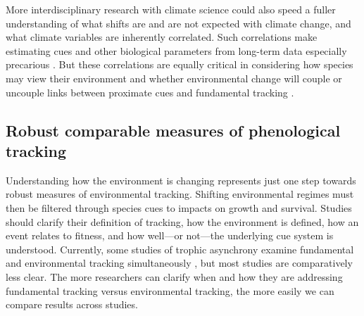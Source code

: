 \documentclass[11pt,letterpaper]{article}
\begin{document}
More interdisciplinary research with climate science could also speed a fuller understanding of what shifts are and are not expected with climate change, and what climate variables are inherently correlated. Such correlations make estimating cues and other biological parameters from long-term data especially precarious \citep{tansey2017}. But these correlations are equally critical in considering how species may view their environment and whether environmental change will couple or uncouple links between proximate cues and fundamental tracking \citep{bonamour2019}. 

\subsection{Robust comparable measures of phenological tracking} 

Understanding how the environment is changing represents just one step towards robust measures of environmental tracking. Shifting environmental regimes must then be filtered through species cues to impacts on growth and survival. Studies should clarify their definition of tracking, how the environment is defined, how an event relates to fitness, and how well---or not---the underlying cue system is understood. Currently, some studies of trophic asynchrony examine fundamental and environmental tracking simultaneously \citep[e.g.,][]{visser2006,charm2008,yang2020}, but most studies are comparatively less clear. The more researchers can clarify when and how they are addressing fundamental tracking versus environmental tracking, the more easily we can compare results across studies. 
\end{document}

